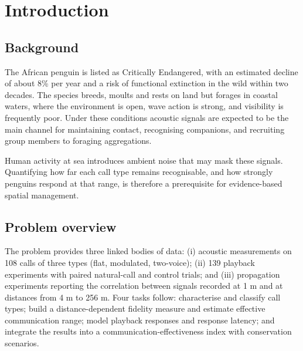 \documentclass{apmcmthesis}
\begin{document}
\newpage
{\footnotesize
\tableofcontents
}

\newpage
\pagestyle{mainmatterstyle}
\setcounter{page}{1}

\section{Introduction}

\subsection{Background}
The African penguin is listed as Critically Endangered, with an estimated decline of about
8\% per year and a risk of functional extinction in the wild within two decades. The species
breeds, moults and rests on land but forages in coastal waters, where the environment is open,
wave action is strong, and visibility is frequently poor. Under these conditions acoustic
signals are expected to be the main channel for maintaining contact, recognising companions,
and recruiting group members to foraging aggregations.

Human activity at sea introduces ambient noise that may mask these signals. Quantifying how
far each call type remains recognisable, and how strongly penguins respond at that range, is
therefore a prerequisite for evidence-based spatial management.

\subsection{Problem overview}
The problem provides three linked bodies of data: (i) acoustic measurements on 108 calls of
three types (flat, modulated, two-voice); (ii) 139 playback experiments with paired natural-call
and control trials; and (iii) propagation experiments reporting the correlation between signals
recorded at 1 m and at distances from 4 m to 256 m. Four tasks follow: characterise and classify
call types; build a distance-dependent fidelity measure and estimate effective communication
range; model playback responses and response latency; and integrate the results into a
communication-effectiveness index with conservation scenarios.
\end{document}
